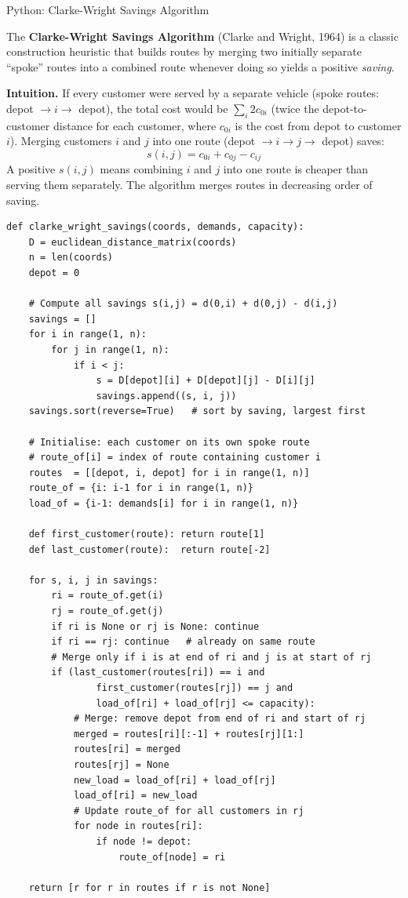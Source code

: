 \documentclass[aspectratio=169,10pt]{beamer}
\begin{document}
\begin{frame}[fragile]{Python: Clarke-Wright Savings Algorithm}

The \textbf{Clarke-Wright Savings Algorithm} (Clarke and Wright, 1964) is a classic
construction heuristic that builds routes by merging two initially separate ``spoke''
routes into a combined route whenever doing so yields a positive \emph{saving}.

\medskip
\textbf{Intuition.}
If every customer were served by a separate vehicle (spoke routes: depot $\to i \to$ depot),
the total cost would be $\sum_i 2 c_{0i}$ (twice the depot-to-customer distance for each
customer, where $c_{0i}$ is the cost from depot to customer $i$).
Merging customers $i$ and $j$ into one route (depot $\to i \to j \to$ depot) saves:
\[
  s(i,j) = c_{0i} + c_{0j} - c_{ij}
\]
A positive $s(i,j)$ means combining $i$ and $j$ into one route is cheaper than serving
them separately.  The algorithm merges routes in decreasing order of saving.

\begin{lstlisting}[caption={Clarke-Wright Savings Algorithm}]
def clarke_wright_savings(coords, demands, capacity):
    D = euclidean_distance_matrix(coords)
    n = len(coords)
    depot = 0

    # Compute all savings s(i,j) = d(0,i) + d(0,j) - d(i,j)
    savings = []
    for i in range(1, n):
        for j in range(1, n):
            if i < j:
                s = D[depot][i] + D[depot][j] - D[i][j]
                savings.append((s, i, j))
    savings.sort(reverse=True)   # sort by saving, largest first

    # Initialise: each customer on its own spoke route
    # route_of[i] = index of route containing customer i
    routes  = [[depot, i, depot] for i in range(1, n)]
    route_of = {i: i-1 for i in range(1, n)}
    load_of = {i-1: demands[i] for i in range(1, n)}

    def first_customer(route): return route[1]
    def last_customer(route):  return route[-2]

    for s, i, j in savings:
        ri = route_of.get(i)
        rj = route_of.get(j)
        if ri is None or rj is None: continue
        if ri == rj: continue   # already on same route
        # Merge only if i is at end of ri and j is at start of rj
        if (last_customer(routes[ri]) == i and
                first_customer(routes[rj]) == j and
                load_of[ri] + load_of[rj] <= capacity):
            # Merge: remove depot from end of ri and start of rj
            merged = routes[ri][:-1] + routes[rj][1:]
            routes[ri] = merged
            routes[rj] = None
            new_load = load_of[ri] + load_of[rj]
            load_of[ri] = new_load
            # Update route_of for all customers in rj
            for node in routes[ri]:
                if node != depot:
                    route_of[node] = ri

    return [r for r in routes if r is not None]
\end{lstlisting}

\end{frame}
\end{document}
